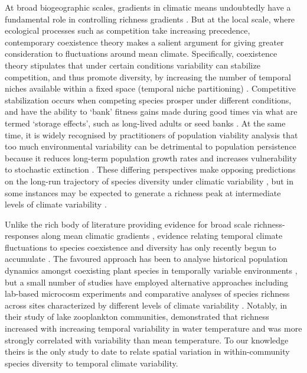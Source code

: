 At broad biogeographic scales, gradients in climatic means undoubtedly have a fundamental role in controlling richness gradients \citep{Francis2003}. But at the local scale, where ecological processes such as competition take increasing precedence, contemporary coexistence theory makes a salient argument for giving greater consideration to fluctuations around mean climate. Specifically, coexistence theory stipulates that under certain conditions variability can stabilize competition, and thus promote diversity, by increasing the number of temporal niches available within a fixed space (temporal niche partitioning) \citep{Chesson1997, Chesson2000}. Competitive stabilization occurs when competing species prosper under different conditions, and have the ability to `bank' fitness gains made during good times via what are termed `storage effects', such as long-lived adults or seed banks \citep{Chesson2000}. At the same time, it is widely recognised by practitioners of population viability analysis that too much environmental variability can be detrimental to population persistence because it reduces long-term population growth rates and increases vulnerability to stochastic extinction \citep{Alvarez2001, Boyce2006}. These differing perspectives make opposing predictions on the long-run trajectory of species diversity under climatic variability \citep{Levine2004}, but in some instances may be expected to generate a richness peak at intermediate levels of climate variability \citep{Adler2008}.

Unlike the rich body of literature providing evidence for broad scale richness-responses along mean climatic gradients \citep[as reviewed in][]{Pausas2001}, evidence relating temporal climate fluctuations to species coexistence and diversity has only recently begun to accumulate \citep{White2010}. The favoured approach has been to analyse historical population dynamics amongst coexisting plant species in temporally variable environments \citep{Levine2004, Adler2006, Adler2009, Angert2009}, but a small number of studies have employed alternative approaches including lab-based microcosm experiments \citep{Descamps-Julien2005, Jiang2007, Tuck2012} and comparative analyses of species richness across sites characterized by different levels of climate variability \citep{Shurin2010}. Notably, in their study of lake zooplankton communities, \citet{Shurin2010} demonstrated that richness increased with increasing temporal variability in water temperature and was more strongly correlated with variability than mean temperature. To our knowledge theirs is the only study to date to relate spatial variation in within-community species diversity to temporal climate variability.

